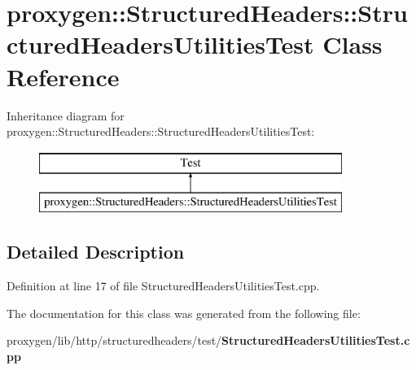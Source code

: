 \section{proxygen\+:\+:Structured\+Headers\+:\+:Structured\+Headers\+Utilities\+Test Class Reference}
\label{classproxygen_1_1StructuredHeaders_1_1StructuredHeadersUtilitiesTest}
Inheritance diagram for proxygen\+:\+:Structured\+Headers\+:\+:Structured\+Headers\+Utilities\+Test\+:\begin{figure}[H]
\begin{center}
\leavevmode
\includegraphics[height=2.000000cm]{classproxygen_1_1StructuredHeaders_1_1StructuredHeadersUtilitiesTest}
\end{center}
\end{figure}


\subsection{Detailed Description}


Definition at line 17 of file Structured\+Headers\+Utilities\+Test.\+cpp.



The documentation for this class was generated from the following file\+:\begin{DoxyCompactItemize}
\item 
proxygen/lib/http/structuredheaders/test/{\bf Structured\+Headers\+Utilities\+Test.\+cpp}\end{DoxyCompactItemize}
